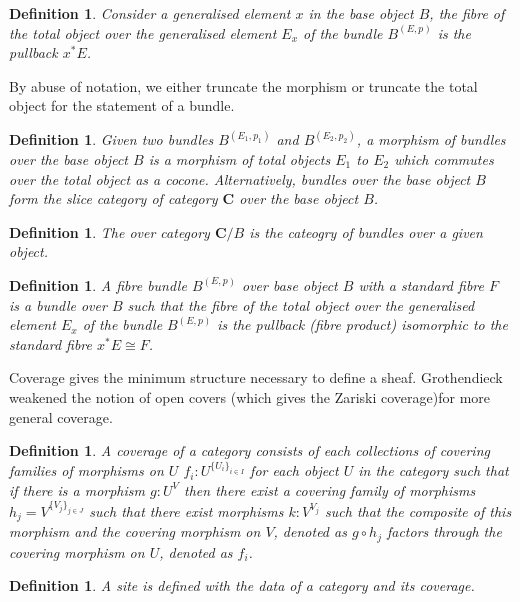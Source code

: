 \documentclass{tufte-book}
\newtheorem{definition}[theorem]{Definition}
\begin{document}
\begin{definition}
	Consider a generalised element $x$ in the base object $B$, the fibre of the total object over the generalised element $E_x$ of the bundle $B^{(E, p)}$ is the pullback $x^*E$.
\end{definition}

By abuse of notation, we either truncate the morphism or truncate the total object for the statement of a bundle.

\begin{definition}
	Given two bundles $B^{(E_1, p_1)}$ and $B^{(E_2, p_2)}$, a morphism of bundles over the base object $B$ is a morphism of total objects $E_1$ to $E_2$ which commutes over the total object as a cocone. Alternatively, bundles over the base object $B$ form the slice category of category $\mathbf{C}$ over the base object $B$. 
\end{definition}

\begin{definition}
	The over category $\mathbf{C} / B$ is the cateogry of bundles over a given object.
\end{definition}

\begin{definition}
	A fibre bundle $B^{(E, p)}$ over base object $B$ with a standard fibre $F$ is a bundle over $B$ such that the fibre of the total object over the generalised element $E_x$ of the bundle $B^{(E, p)}$ is the pullback (fibre product) isomorphic to the standard fibre $x^*E \cong F$.
\end{definition}

Coverage gives the minimum structure necessary to define a sheaf. Grothendieck weakened the notion of open covers (which gives the Zariski coverage)for more general coverage.

\begin{definition}
	A coverage of a category consists of each collections of covering families of morphisms on $U$ $f_i : U^{\{U_i\}_{i \in I}}$ for each object $U$ in the category such that if there is a morphism $g : U^V$ then there exist a covering family of morphisms $h_j = V^{\{V_j\}_{j \in J}}$
	such that there exist morphisms $k : V^{V_j}$ such that the composite of this morphism and the covering morphism on $V$, denoted as $g \circ h_j$ factors through the covering morphism on $U$, denoted as $f_i$.
\end{definition}

\begin{definition}
	A site is defined with the data of a category and its coverage.
\end{definition}
\end{document}
